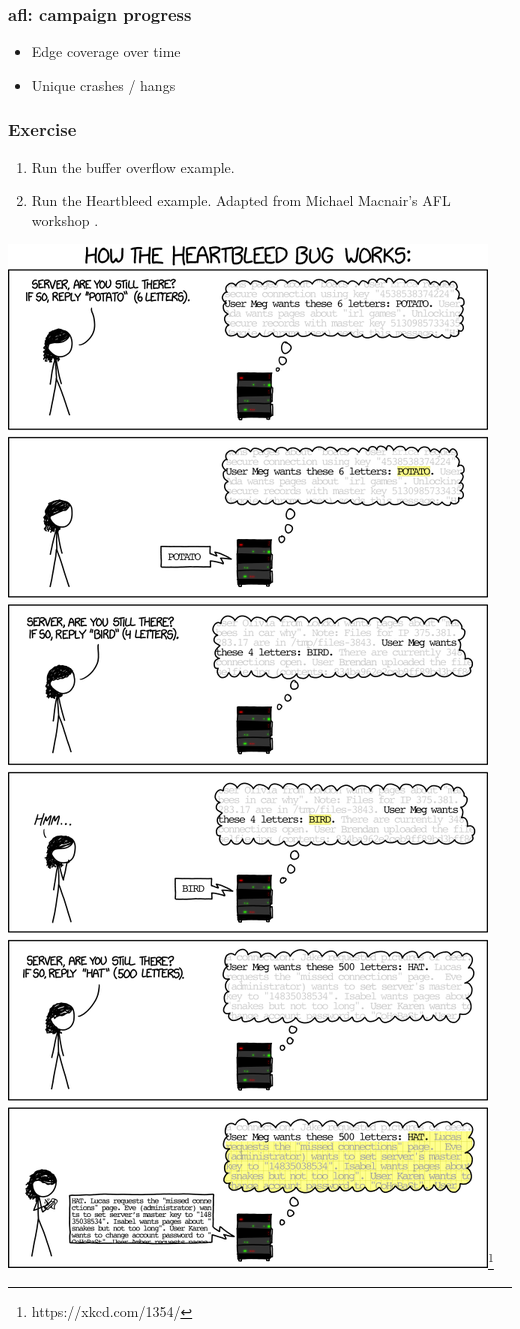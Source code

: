 \documentclass{beamer}
\begin{document}
\begin{frame}
	\frametitle{afl: campaign progress}
	\begin{itemize}
		\item{Edge coverage over time}
		\item{Unique crashes / hangs}
	\end{itemize}
\end{frame}

\begin{frame}
	\frametitle{Exercise}
	\begin{enumerate} 
		\item{Run the buffer overflow example.}
		\item{Run the Heartbleed example. Adapted from Michael Macnair's AFL workshop \cite{macnair}.}

	\end{enumerate}
	\centering \includegraphics[scale=.12]{heartbleed_explanation}\footnote{https://xkcd.com/1354/}

\end{frame}
\end{document}
